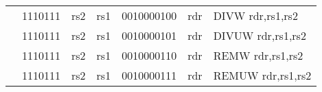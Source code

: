 \begin{table}[p]
\begin{small}
\begin{center}
\begin{tabular}{rcccccccccl}
&
\multicolumn{2}{|c|}{1110111} &
\multicolumn{1}{c|}{rs2} &
\multicolumn{1}{c|}{rs1} &
\multicolumn{4}{c|}{0010000100} &
\multicolumn{1}{c|}{rdr} & DIVW rdr,rs1,rs2 \\
\cline{2-10}
  

&
\multicolumn{2}{|c|}{1110111} &
\multicolumn{1}{c|}{rs2} &
\multicolumn{1}{c|}{rs1} &
\multicolumn{4}{c|}{0010000101} &
\multicolumn{1}{c|}{rdr} & DIVUW rdr,rs1,rs2 \\
\cline{2-10}
  

&
\multicolumn{2}{|c|}{1110111} &
\multicolumn{1}{c|}{rs2} &
\multicolumn{1}{c|}{rs1} &
\multicolumn{4}{c|}{0010000110} &
\multicolumn{1}{c|}{rdr} & REMW rdr,rs1,rs2 \\
\cline{2-10}
  

&
\multicolumn{2}{|c|}{1110111} &
\multicolumn{1}{c|}{rs2} &
\multicolumn{1}{c|}{rs1} &
\multicolumn{4}{c|}{0010000111} &
\multicolumn{1}{c|}{rdr} & REMUW rdr,rs1,rs2 \\
\cline{2-10}
  

\end{tabular}
\end{center}
\end{small}

\label{instr-table}
\end{table}
  

\newpage

